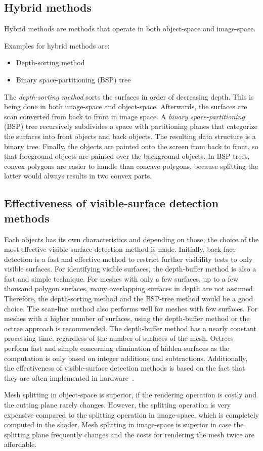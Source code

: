 \subsection{Hybrid methods}
Hybrid methods are methods that operate in both object-space and image-space.

Examples for hybrid methods are:
\begin{itemize}
	\item Depth-sorting method
	\item Binary space-partitioning (BSP) tree
\end{itemize}

The \emph{depth-sorting method} sorts the surfaces in order of decreasing depth. This is being done in both image-space and object-space. Afterwards, the surfaces are scan converted from back to front in image space. A \emph{binary space-partitioning} (BSP) tree recursively subdivides a space with partitioning planes that categorize the surfaces into front objects and back objects. The resulting data structure is a binary tree. Finally, the objects are painted onto the screen from back to front, so that foreground objects are painted over the background objects. In BSP trees, convex polygons are easier to handle than concave polygons, because splitting the latter would always results in two convex parts.

\subsection{Effectiveness of visible-surface detection methods}
Each objects has its own characteristics and depending on those, the choice of the most effective visible-surface detection method is made. Initially, back-face detection is a fast and effective method to restrict further visibility tests to only visible surfaces. For identifying visible surfaces, the depth-buffer method is also a fast and simple technique. For meshes with only a few surfaces, up to a few thousand polygon surfaces, many overlapping surfaces in depth are not assumed. Therefore, the depth-sorting method and the BSP-tree method would be a good choice. The scan-line method also performs well for meshes with few surfaces. For meshes with a higher number of surfaces, using the depth-buffer method or the octree approach is recommended. The depth-buffer method has a nearly constant processing time, regardless of the number of surfaces of the mesh. Octrees perform fast and simple concerning elimination of hidden-surfaces as the computation is only based on integer additions and subtractions. Additionally, the effectiveness of visible-surface detection methods is based on the fact that they are often implemented in hardware~\cite{book:computerGraphicsHearn}.

Mesh splitting in object-space is superior, if the rendering operation is costly and the cutting plane rarely changes. However, the splitting operation is very expensive compared to the splitting operation in image-space, which is completely computed in the shader. Mesh splitting in image-space is superior in case the splitting plane frequently changes and the costs for rendering the mesh twice are affordable.